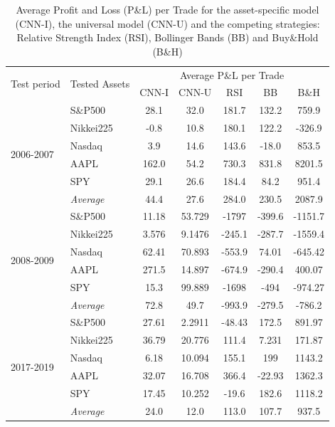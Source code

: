 \documentclass[11pt, a4paper]{article}
\begin{document}
\begin{table}[H]
\centering
\begin{tabular}{l|l|ccccc}
        \multicolumn{1}{m{1cm}|}{\multirow{2}{1cm}{Test period}} & \multicolumn{1}{m{1.5cm}|}{\multirow{2}{1.5cm}{Tested Assets}}  &       \multicolumn{5}{c}{Average P\&L per Trade}  \\ \cline{3-7}
          &           & CNN-I   & CNN-U   & RSI     & BB      & B\&H    \\
          \hline \hline
\multirow{6}{1cm}{2006-2007} & S\&P500   & 28.1   & 32.0   & 181.7  & 132.2  & 759.9  \\
          & Nikkei225 &-0.8   & 10.8   & 180.1  & 122.2  & -326.9 \\
          & Nasdaq   & 3.9    & 14.6   & 143.6  & -18.0  & 853.5  \\
          & AAPL     & 162.0  & 54.2   & 730.3  & 831.8  & 8201.5 \\
          & SPY       & 29.1   & 26.6   & 184.4  & 84.2   & 951.4  \\
          \cline{2-7}
          & \textit{Average}    & 44.4   & 27.6   & 284.0  & 230.5  & 2087.9 \\
          \hline
\multirow{6}{1cm}{2008-2009} & S\&P500          & 11.18 & 53.729 & -1797  & -399.6 & -1151.7 \\
 & Nikkei225        & 3.576 & 9.1476 & -245.1 & -287.7 & -1559.4 \\
 & Nasdaq           & 62.41 & 70.893 & -553.9 & 74.01  & -645.42 \\
 & AAPL             & 271.5 & 14.897 & -674.9 & -290.4 & 400.07  \\
 & SPY              & 15.3  & 99.889 & -1698  & -494   & -974.27 \\ \cline{2-7} 
 & \textit{Average} & 72.8  & 49.7   & -993.9 & -279.5 & -786.2 \\
\hline
\multirow{6}{1cm}{2017-2019}   & S\&P500  & 27.61  & 2.2911 & -48.43 & 172.5  & 891.97 \\
          & Nikkei225 & 36.79  & 20.776 & 111.4  & 7.231  & 171.87 \\
          & Nasdaq    & 6.18   & 10.094 & 155.1  & 199    & 1143.2 \\
          & AAPL    & 32.07  & 16.708 & 366.4  & -22.93 & 1362.3 \\
          & SPY   & 17.45  & 10.252 & -19.6  & 182.6  & 1118.2 \\
          \cline{2-7}
          & \textit{Average}   & 24.0   & 12.0   & 113.0  & 107.7  & 937.5 
\end{tabular}
\caption{Average Profit and Loss (P\&L) per Trade for the asset-specific model (CNN-I), the universal model (CNN-U) and the competing strategies: Relative Strength Index (RSI), Bollinger Bands (BB) and Buy\&Hold (B\&H)}
\label{tbl:PandLAvg}
\end{table}
\end{document}
